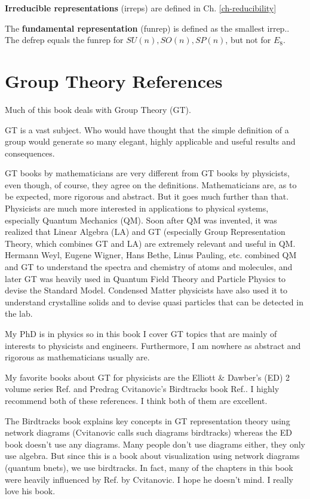 {\bf Irreducible representations} (irreps)
are defined in Ch. \ref{ch-reducibility}

The {\bf fundamental representation} (funrep)
is defined as the smallest irrep.. 
The defrep equals the funrep for
$SU(n), SO(n), SP(n)$, but not for $E_8$.



\section{Group Theory References}
Much of this book
deals with Group Theory (GT).


GT is a vast subject. Who would have thought
that the simple definition of 
a group would generate so many elegant, highly applicable and useful results and
consequences.

GT books by mathematicians are very
different from GT
books by physicists,
even though, of course,
they agree on the definitions. 
Mathematicians
are, as to be expected, more rigorous and abstract. But it goes much further than that. Physicists are much
more interested in applications
to physical systems,
especially Quantum Mechanics (QM).
Soon after QM was invented,
it was realized that Linear Algebra (LA) and GT  (especially Group Representation Theory,
which combines GT and LA)
are extremely
relevant and useful in QM.
Hermann Weyl,
Eugene Wigner, Hans Bethe, Linus Pauling, etc.
combined QM and GT to understand the spectra and chemistry of atoms and molecules,
and later GT was heavily used in Quantum Field Theory and Particle Physics to devise 
the Standard Model. Condensed Matter physicists have also used it to understand crystalline solids and to devise quasi particles that can be detected in the lab. 

My PhD is in physics
so in this book I cover 
GT topics that are  mainly of interests to
physicists and engineers. Furthermore,
I am nowhere as abstract and
rigorous as mathematicians 
usually are.

My favorite books about GT 
for physicists are the Elliott \& Dawber's (ED)
2 volume series Ref. \cite{eli-daw-book}
and Predrag Cvitanovic's Birdtracks book
Ref.\cite{birdtracks-book}. I highly
recommend both of these references. I think
both of them are excellent.

The Birdtracks book explains key 
concepts in GT representation theory
using network diagrams 
(Cvitanovic calls 
such diagrams birdtracks) whereas the ED book doesn't use any diagrams. Many people don't use diagrams either, they only use algebra.
But since this is a book
about visualization using network diagrams (quantum 
bnets), we use birdtracks.
In fact, many
of the chapters in this
book were heavily influenced 
by Ref.\cite{birdtracks-book}
by Cvitanovic. I hope he doesn't mind. I really love his  book.

